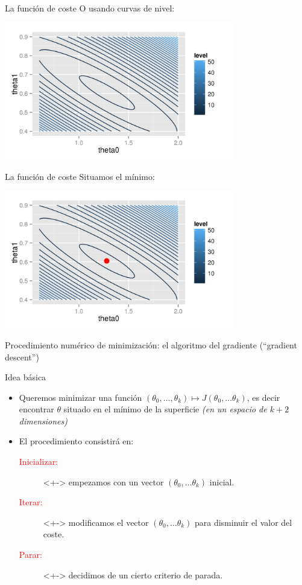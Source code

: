 \documentclass[aspectratio=169]{beamer}
\begin{document}
\begin{frame}{La función de coste}
  O usando curvas de nivel:
\begin{center}
  \includegraphics[height=6cm]{contour_coste_recta.png}
\end{center}
\end{frame}
\begin{frame}{La función de coste}
  Situamos el mínimo:
\begin{center}
  \includegraphics[height=6cm]{contour_coste_recta_con_min.png}
\end{center}
\end{frame}
\begin{frame}{Procedimiento numérico de minimización: el algoritmo del
    gradiente (``gradient descent'')}
\begin{block}{Idea básica}
  \begin{itemize}
\item<+-> Queremos minimizar una función  $(\theta_0,\ldots, \theta_k)\mapsto J(\theta_0,\ldots\theta_k)$, es decir encontrar $\theta$ situado en el mínimo de la superficie \textit{\scriptsize(en un espacio de $k+2$ dimensiones)}
\item<+-> El  procedimiento consistirá en:
\begin{description}
\item[\textcolor{red}{Inicializar:}]<+-> empezamos con un vector $(\theta_0,\ldots \theta_k)$ inicial.
\item[\textcolor{red}{Iterar:}]<+-> modificamos el vector $(\theta_0,\ldots\theta_k)$ para disminuir el valor del coste.
\item[\textcolor{red}{Parar:}]<+-> decidimos de un cierto criterio de parada.
\end{description}
\end{itemize}
\end{block}

\end{frame}
\end{document}
